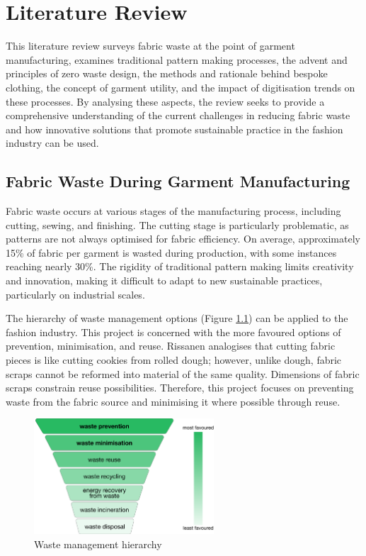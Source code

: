 \chapter{Literature Review}
This literature review surveys fabric waste at the point of garment manufacturing, examines traditional pattern making processes, the advent and principles of zero waste design, the methods and rationale behind bespoke clothing, the concept of garment utility, and the impact of digitisation trends on these processes. By analysing these aspects, the review seeks to provide a comprehensive understanding of the current challenges in reducing fabric waste and how innovative solutions that promote sustainable practice in the fashion industry can be used.

\section{Fabric Waste During Garment Manufacturing}
Fabric waste occurs at various stages of the manufacturing process, including cutting, sewing, and finishing. The cutting stage is particularly problematic, as patterns are not always optimised for fabric efficiency. On average, approximately 15\% of fabric per garment is wasted during production, with some instances reaching nearly 30\%. The rigidity of traditional pattern making limits creativity and innovation, making it difficult to adapt to new sustainable practices, particularly on industrial scales.

The hierarchy of waste management options (Figure \ref{fig:waste_hierarchy}) can be applied to the fashion industry. This project is concerned with the more favoured options of prevention, minimisation, and reuse. Rissanen analogises that cutting fabric pieces is like cutting cookies from rolled dough; however, unlike dough, fabric scraps cannot be reformed into material of the same quality. Dimensions of fabric scraps constrain reuse possibilities. Therefore, this project focuses on preventing waste from the fabric source and minimising it where possible through reuse.
\begin{figure} [htb]
    \centering
    \includegraphics[width=0.6\textwidth]{Images/waste hierarchy.png}
    \caption{Waste management hierarchy \cite{rissanen_zero-waste_2013,}}
    \label{fig:waste_hierarchy}
\end{figure}

